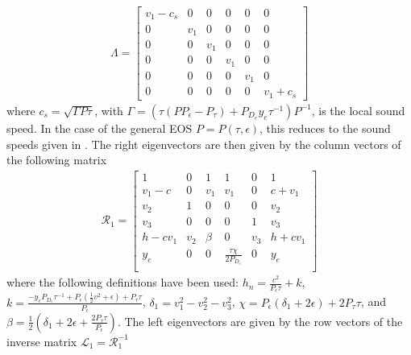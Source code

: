 \documentclass[onecolumn]{aastex62}
\begin{document}
\begin{align}
\Lambda =
\begin{bmatrix}
  v_{1} - c_{s} & 0 & 0& 0& 0& 0 \\
  0 & v_{1} & 0 & 0 & 0 & 0      \\
  0 & 0 & v_{1} & 0 & 0 & 0      \\
  0 & 0 & 0 & v_{1} & 0 & 0      \\
  0 & 0 & 0 & 0 & v_{1} & 0      \\
  0 & 0 & 0 & 0 & 0 & v_{1} + c_{s}
\end{bmatrix}
\end{align}
where $c_{s} = \sqrt{\Gamma P \tau}$, with
$\Gamma = \left(\tau (P P_{\epsilon} - P_{\tau}) + P_{D_e} y_{e} \tau^{-1}\right) P^{-1}$, is
the local sound speed. In the case of the general EOS $P=P(\tau,\epsilon)$,
this reduces to the sound speeds given in \citet{colella:1985}.
The right eigenvectors are then given by the column vectors of the following matrix
\begin{align*}
  \mathcal{R}_{1} =
  \left[
  \begin{array}{cccccc}
   1 & 0 & 1 & 1 & 0 & 1 \\
   v_{1}-c & 0 & v_{1} & v_{1} & 0 & c+v_{1} \\
   v_{2} & 1 & 0 & 0 & 0 & v_{2} \\
   v_{3} & 0 & 0 & 0 & 1 & v_{3} \\
   h-c v_{1} & v_{2} & \beta & 0 & v_{3} & h+c v_{1} \\
   y_{e}  & 0 & 0 & \frac{\tau  \chi }{2 P_{D_{e}}} & 0 & y_{e}  \\
  \end{array}
  \right]
\end{align*}
where the following definitions have been used:
$h_{n} = \frac{c^2}{P_{\epsilon}\tau} + k $, $k = \frac{-y_{e} P_{D_{e}} \tau^{-1}
+ P_{\epsilon} (\frac{1}{2}v^2 + \epsilon) + P_{\tau}\tau}{P_{\epsilon}}$,
$\delta_{1} = v_{1}^{2}-v_{2}^{2}-v_{3}^{2}$,
$\chi = P_{\epsilon} ( \delta_{1} + 2\epsilon) + 2P_{\tau}\tau$, and
$\beta = \frac{1}{2} (\delta_{1}+2 \epsilon +\frac{2 P_{\tau} \tau }{P_{\epsilon}})$.
The left eigenvectors are given by the row vectors of the inverse matrix $\mathcal{L}_{1} = \mathcal{R}_{1}^{-1}$
\end{document}
